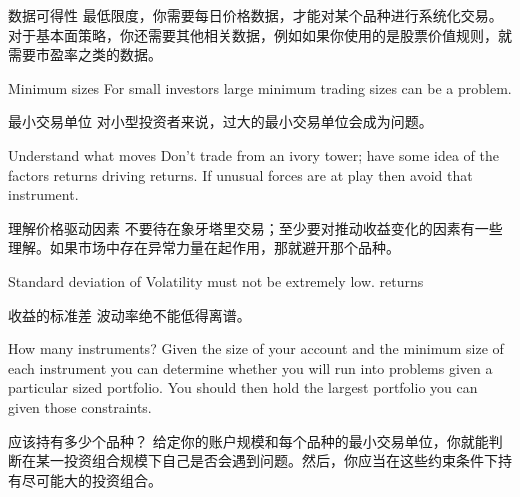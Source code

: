 \begin{chineseblock}数据可得性 最低限度，你需要每日价格数据，才能对某个品种进行系统化交易。对于基本面策略，你还需要其他相关数据，例如如果你使用的是股票价值规则，就需要市盈率之类的数据。\end{chineseblock}

\bipairgap

\begin{englishblock} Minimum sizes For small investors large minimum trading sizes can be a problem. \end{englishblock}

\begin{chineseblock}最小交易单位 对小型投资者来说，过大的最小交易单位会成为问题。\end{chineseblock}

\bipairgap

\begin{englishblock} Understand what moves Don't trade from an ivory tower; have some idea of the factors returns driving returns. If unusual forces are at play then avoid that instrument. \end{englishblock}

\begin{chineseblock}理解价格驱动因素 不要待在象牙塔里交易；至少要对推动收益变化的因素有一些理解。如果市场中存在异常力量在起作用，那就避开那个品种。\end{chineseblock}

\bipairgap

\begin{englishblock} Standard deviation of Volatility must not be extremely low. returns \end{englishblock}

\begin{chineseblock}收益的标准差 波动率绝不能低得离谱。\end{chineseblock}

\bipairgap

\begin{englishblock} How many instruments? Given the size of your account and the minimum size of each instrument you can determine whether you will run into problems given a particular sized portfolio. You should then hold the largest portfolio you can given those constraints. \end{englishblock}

\begin{chineseblock}应该持有多少个品种？ 给定你的账户规模和每个品种的最小交易单位，你就能判断在某一投资组合规模下自己是否会遇到问题。然后，你应当在这些约束条件下持有尽可能大的投资组合。\end{chineseblock}

